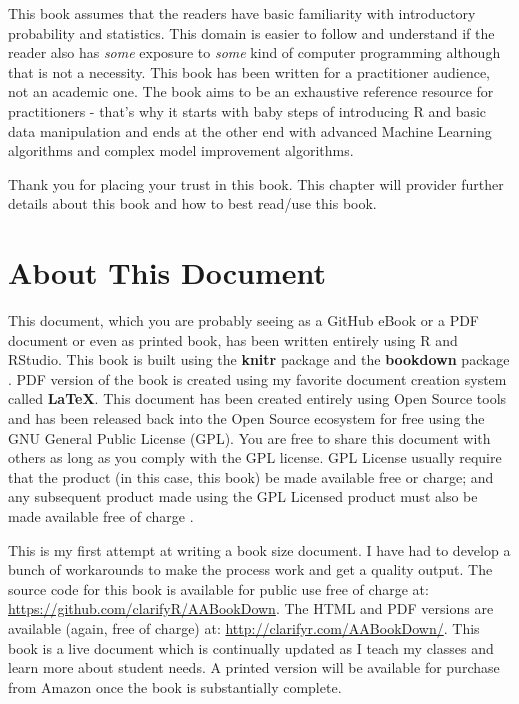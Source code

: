 \documentclass[]{krantz}
\theoremstyle{definition}
\theoremstyle{definition}
\theoremstyle{definition}
\theoremstyle{remark}
\begin{document}
This book assumes that the readers have basic familiarity with
introductory probability and statistics. This domain is easier to follow
and understand if the reader also has \emph{some} exposure to
\emph{some} kind of computer programming although that is not a
necessity. This book has been written for a practitioner audience, not
an academic one. The book aims to be an exhaustive reference resource
for practitioners - that's why it starts with baby steps of introducing
R and basic data manipulation and ends at the other end with advanced
Machine Learning algorithms and complex model improvement algorithms.

Thank you for placing your trust in this book. This chapter will
provider further details about this book and how to best read/use this
book.

\section*{About This Document}\label{about-this-document}


This document, which you are probably seeing as a GitHub eBook or a PDF
document or even as printed book, has been written entirely using R and
RStudio. This book is built using the \textbf{knitr}
package \citep{xie2015} and the \textbf{bookdown}
package \citep{R-bookdown}. PDF version of the book is created using my
favorite document creation system called \textbf{LaTeX}. This document
has been created entirely using Open Source tools and has been released
back into the Open Source ecosystem for free using the GNU General
Public License (GPL). You are free to share this document with others as
long as you comply with the GPL license. GPL License usually require
that the product (in this case, this book) be made available free or
charge; and any subsequent product made using the GPL Licensed product
must also be made available free of charge \citep{TheGNUGe51:online}.

This is my first attempt at writing a book size document. I have had to
develop a bunch of workarounds to make the process work and get a
quality output. The source code for this book is available for public
use free of charge at: \url{https://github.com/clarifyR/AABookDown}. The
HTML and PDF versions are available (again, free of charge) at:
\url{http://clarifyr.com/AABookDown/}. This book is a live document
which is continually updated as I teach my classes and learn more about
student needs. A printed version will be available for purchase from
Amazon once the book is substantially complete.
\end{document}
